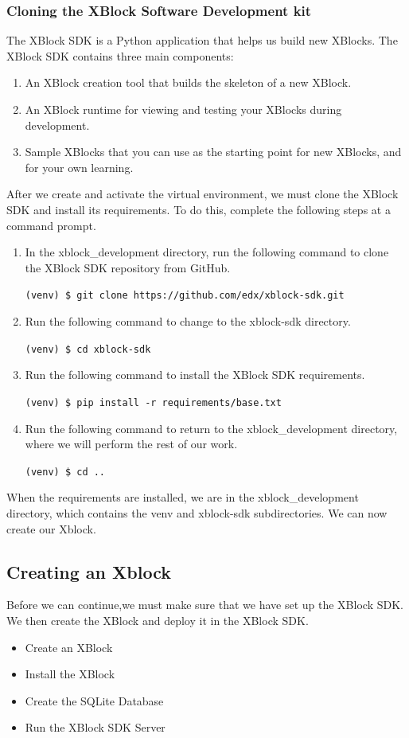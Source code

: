 \subsubsection{Cloning the XBlock Software Development kit}
The XBlock SDK is a Python application that helps us build new XBlocks. The XBlock
SDK contains three main components:
\begin{enumerate}
\item An XBlock creation tool that builds the skeleton of a new XBlock.
\item An XBlock runtime for viewing and testing your XBlocks during development.
\item Sample XBlocks that you can use as the starting point for new XBlocks, and for your
own learning.
\end{enumerate}
After we create and activate the virtual environment, we must clone the XBlock SDK and
install its requirements. To do this, complete the following steps at a command prompt.
\begin{enumerate}
\item In the xblock\_development directory, run the following command to clone the
XBlock SDK repository from GitHub.
\begin{center}\verb=(venv) $ git clone https://github.com/edx/xblock-sdk.git=\end{center}
\item Run the following command to change to the xblock-sdk directory.
\begin{center}\verb=(venv) $ cd xblock-sdk=\end{center}
\item Run the following command to install the XBlock SDK requirements.
\begin{center}\verb=(venv) $ pip install -r requirements/base.txt=\end{center}
\item Run the following command to return to the xblock\_development directory,
where we will perform the rest of our work.
\begin{center}\verb=(venv) $ cd ..=\end{center}
\end{enumerate}
When the requirements are installed, we are in the xblock\_development directory, which
contains the venv and xblock-sdk subdirectories. We can now create our Xblock.


\subsection{Creating an Xblock}
Before we can continue,we must make sure that we have set up the XBlock SDK. We then create the XBlock
and deploy it in the XBlock SDK.
\begin{itemize}
\item Create an XBlock
\item Install the XBlock
\item Create the SQLite Database
\item Run the XBlock SDK Server
\end{itemize}

